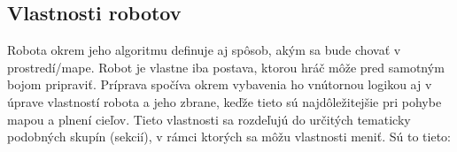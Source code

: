 \subsection{Vlastnosti robotov}
\indent Robota okrem jeho algoritmu definuje aj spôsob, akým sa bude chovať v prostredí/mape.
Robot je vlastne iba postava, ktorou hráč môže pred samotným bojom pripraviť. Príprava spočíva okrem vybavenia ho vnútornou logikou aj v úprave vlastností robota a jeho zbrane, keďže tieto sú najdôležitejšie pri pohybe mapou a plnení cieľov. Tieto vlastnosti sa rozdeľujú do určitých tematicky podobných skupín (sekcií), v rámci ktorých sa môžu vlastnosti meniť. Sú to tieto:
